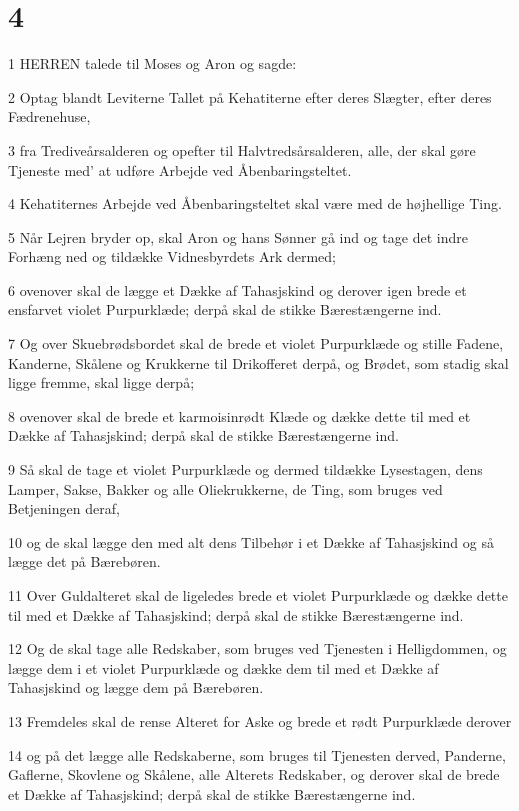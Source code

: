\chapter{4}

\par 1 HERREN talede til Moses og Aron og sagde:
\par 2 Optag blandt Leviterne Tallet på Kehatiterne efter deres Slægter, efter deres Fædrenehuse,
\par 3 fra Trediveårsalderen og opefter til Halvtredsårsalderen, alle, der skal gøre Tjeneste med' at udføre Arbejde ved Åbenbaringsteltet.
\par 4 Kehatiternes Arbejde ved Åbenbaringsteltet skal være med de højhellige Ting.
\par 5 Når Lejren bryder op, skal Aron og hans Sønner gå ind og tage det indre Forhæng ned og tildække Vidnesbyrdets Ark dermed;
\par 6 ovenover skal de lægge et Dække af Tahasjskind og derover igen brede et ensfarvet violet Purpurklæde; derpå skal de stikke Bærestængerne ind.
\par 7 Og over Skuebrødsbordet skal de brede et violet Purpurklæde og stille Fadene, Kanderne, Skålene og Krukkerne til Drikofferet derpå, og Brødet, som stadig skal ligge fremme, skal ligge derpå;
\par 8 ovenover skal de brede et karmoisinrødt Klæde og dække dette til med et Dække af Tahasjskind; derpå skal de stikke Bærestængerne ind.
\par 9 Så skal de tage et violet Purpurklæde og dermed tildække Lysestagen, dens Lamper, Sakse, Bakker og alle Oliekrukkerne, de Ting, som bruges ved Betjeningen deraf,
\par 10 og de skal lægge den med alt dens Tilbehør i et Dække af Tahasjskind og så lægge det på Bærebøren.
\par 11 Over Guldalteret skal de ligeledes brede et violet Purpurklæde og dække dette til med et Dække af Tahasjskind; derpå skal de stikke Bærestængerne ind.
\par 12 Og de skal tage alle Redskaber, som bruges ved Tjenesten i Helligdommen, og lægge dem i et violet Purpurklæde og dække dem til med et Dække af Tahasjskind og lægge dem på Bærebøren.
\par 13 Fremdeles skal de rense Alteret for Aske og brede et rødt Purpurklæde derover
\par 14 og på det lægge alle Redskaberne, som bruges til Tjenesten derved, Panderne, Gaflerne, Skovlene og Skålene, alle Alterets Redskaber, og derover skal de brede et Dække af Tahasjskind; derpå skal de stikke Bærestængerne ind.
